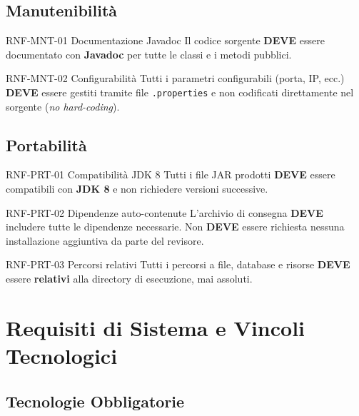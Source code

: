 \documentclass[12pt, a4paper]{article}
\newcommand{\mustshall}{\textbf{DEVE}}
\newcommand{\code}[1]{\texttt{#1}}
\begin{document}
\subsection{Manutenibilità}

\begin{reqbox}{RNF-MNT-01 \quad Documentazione Javadoc \quad [MUST]}
Il codice sorgente \mustshall{} essere documentato con \textbf{Javadoc} per tutte le classi e i metodi pubblici.
\end{reqbox}

\begin{reqbox}{RNF-MNT-02 \quad Configurabilità \quad [MUST]}
Tutti i parametri configurabili (porta, IP, ecc.) \mustshall{} essere gestiti tramite file \code{.properties} e non codificati direttamente nel sorgente (\textit{no hard-coding}).
\end{reqbox}

\subsection{Portabilità}

\begin{reqbox}{RNF-PRT-01 \quad Compatibilità JDK 8 \quad [MUST]}
Tutti i file JAR prodotti \mustshall{} essere compatibili con \textbf{JDK 8} e non richiedere versioni successive.
\end{reqbox}

\begin{reqbox}{RNF-PRT-02 \quad Dipendenze auto-contenute \quad [MUST]}
L'archivio di consegna \mustshall{} includere tutte le dipendenze necessarie. Non \mustshall{} essere richiesta nessuna installazione aggiuntiva da parte del revisore.
\end{reqbox}

\begin{reqbox}{RNF-PRT-03 \quad Percorsi relativi \quad [MUST]}
Tutti i percorsi a file, database e risorse \mustshall{} essere \textbf{relativi} alla directory di esecuzione, mai assoluti.
\end{reqbox}

\newpage
\section{Requisiti di Sistema e Vincoli Tecnologici}

\subsection{Tecnologie Obbligatorie}
\end{document}

